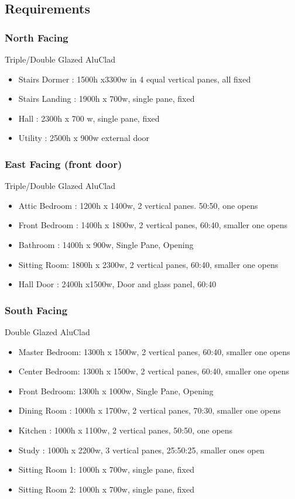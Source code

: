 \subsection{Requirements}
\subsubsection{North Facing}
Triple/Double Glazed AluClad
\begin{itemize}
\item Stairs Dormer : 1500h x3300w in 4 equal vertical panes, all fixed
\item Stairs Landing : 1900h x 700w, single pane, fixed
\item Hall : 2300h x 700 w, single pane, fixed
\item Utility : 2500h x 900w external door
\end{itemize}    
    
\subsubsection{East Facing (front door)}
Triple/Double Glazed AluClad
\begin{itemize}
\item Attic Bedroom : 1200h x 1400w, 2 vertical panes. 50:50, one opens
\item Front Bedroom : 1400h x 1800w, 2 vertical panes, 60:40, smaller one opens
\item Bathroom : 1400h x 900w, Single Pane, Opening
\item Sitting Room: 1800h x 2300w, 2 vertical panes, 60:40, smaller one opens
\item Hall Door : 2400h x1500w, Door and glass panel, 60:40
    
\end{itemize}

\subsubsection{South Facing}
Double Glazed AluClad
\begin{itemize}
\item Master Bedroom: 1300h x 1500w, 2 vertical panes, 60:40, smaller one opens
\item Center Bedroom: 1300h x 1500w, 2 vertical panes, 60:40, smaller one opens
\item Front Bedroom: 1300h x 1000w, Single Pane, Opening
\item Dining Room : 1000h x 1700w, 2 vertical panes, 70:30, smaller one opens
\item Kitchen : 1000h x 1100w, 2 vertical panes, 50:50, one opens
\item Study :   1000h x 2200w, 3 vertical panes, 25:50:25, smaller ones open
\item Sitting Room 1: 1000h x 700w, single pane, fixed
\item Sitting Room 2: 1000h x 700w, single pane, fixed
\end{itemize}

